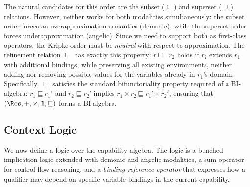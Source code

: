The natural candidates for this order are the subset ($\subseteq$) and
superset ($\supseteq$) relations.  However, neither works for both
modalities simultaneously: the subset order forces an
overapproximation semantics (demonic), while the superset order forces
underapproximation (angelic).  Since we need to support both as
first-class operators, the Kripke order must be \emph{neutral} with
respect to approximation.  The refinement relation $\sqsubseteq$ has
exactly this property: $r1 \sqsubseteq r_2$ holds if $r_2$ extends
$r_1$ with additional bindings, while preserving all existing
environments, neither adding nor removing possible values for the
variables already in $r_1$'s domain.  Specifically, $\sqsubseteq$
satisfies the standard bifunctoriality property required of a
BI-algebra: $r_1 \sqsubseteq r_1'$ and $r_2 \sqsubseteq r_2'$ implies
$r_1 \times r_2 \sqsubseteq r_1' \times r_2'$, ensuring that $(\Res,
+, \times, \mathbf{1}, \sqsubseteq)$ forms a BI-algebra.


\subsection{Context Logic}\label{subsec:logic}

We now define a logic over the capability algebra.  The logic is a
bunched implication logic extended with demonic and angelic
modalities, a sum operator for control-flow reasoning, and a
\emph{binding reference operator} that expresses how a qualifier may
depend on specific variable bindings in the current capability.

